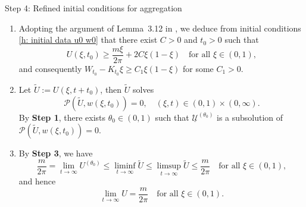 \begin{frame}{Step 4: Refined initial conditions for aggregation}
\begin{enumerate}
  \item Adopting the argument of Lemma~3.12 in , we deduce from initial conditions \eqref{h: initial data u0 w0} that there exist $C > 0$ and $t_0>0$ such that
      \[
      U(\xi , t_0) \geqslant \frac{m\xi}{2\pi} + 2C\xi(1 - \xi)
\quad\text{for all } \xi\in (0, 1),
\]
and consequently
\(
W_{t_0} - K_{t_0}\xi \geqslant  C_1\xi(1-\xi)\) for some \(C_1>0\).
  \item Let $\tilde{U}:= U(\xi, t + t_0)$, then $\tilde{U}$ solves 
      \[
      \mathcal{P}(\tilde{U}, w(\xi, t_0)) = 0,\quad(\xi, t)\in(0,1)\times(0,\infty).
      \]
      By \textbf{Step 1}, there exists \(\theta_0\in(0,1)\) such that \(\underline{\mathscr U}^{(\theta_0)}\) is a subsolution of $\mathcal{P}(\tilde{U}, w(\xi, t_0)) = 0$.
  \item By \textbf{Step 3}, we have
  \[
    \frac{m}{2\pi} = \lim_{t\to\infty}U^{(\theta_0)}\leqslant\liminf_{t\to\infty}\tilde{U}\leqslant\limsup_{t\to\infty}\tilde{U}\leqslant\frac{m}{2\pi} \quad\text{for all } \xi\in(0,1),
\]
and hence
\[
    \lim_{t\to\infty}U=\frac{m}{2\pi}\quad\text{for all } \xi\in(0, 1).
\]
\end{enumerate}
\end{frame}











